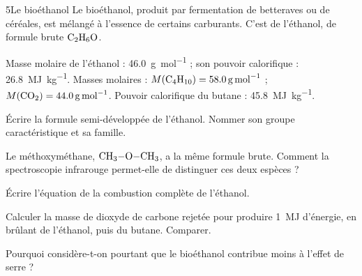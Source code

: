\begin{exoBac}{5}{Le bioéthanol}
Le bioéthanol, produit par fermentation de betteraves ou de céréales, est mélangé à l'essence de certains carburants. C'est de
l'éthanol, de formule brute $\ce{C2H6O}$.
\begin{donnees}
Masse molaire de l'éthanol : \qty{46,0}{g.mol^{-1}} ; son pouvoir calorifique : \qty{26,8}{MJ.kg^{-1}}. Masses molaires : $M(\ce{C4H10})=\qty{58,0}{g.mol^{-1}}$ ;
$M(\ce{CO2})=\qty{44,0}{g.mol^{-1}}$. Pouvoir calorifique du butane : \qty{45,8}{MJ.kg^{-1}}.
\end{donnees}
\begin{questions}
\item Écrire la formule semi-développée de l'éthanol. Nommer son groupe caractéristique et sa famille.
\item Le méthoxyméthane, $\ce{CH3-O-CH3}$, a la même formule brute. Comment la spectroscopie infrarouge permet-elle de distinguer ces
deux espèces ?
\item Écrire l'équation de la combustion complète de l'éthanol.
\item Calculer la masse de dioxyde de carbone rejetée pour produire \qty{1}{MJ} d'énergie, en brûlant de l'éthanol, puis du butane. Comparer.
\item Pourquoi considère-t-on pourtant que le bioéthanol contribue moins à l'effet de serre ?
\end{questions}
\end{exoBac}
